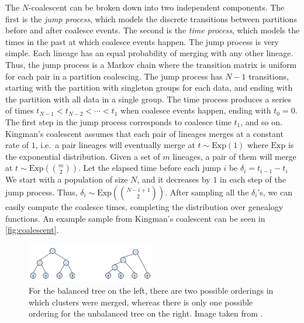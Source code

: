 \documentclass{article}
\begin{document}
The $N$-coalescent
can be broken down into two
independent components.
The first is the \emph{jump process},
which models the discrete transitions
between partitions
before and after coalesce events.
The second is the \emph{time process},
which models the times in the past
at which coalesce events happen.
The jump process is very simple.
Each lineage has an equal probability of merging
with any other lineage. Thus, the
jump process is a Markov chain
where the transition matrix is uniform
for each pair in a partition coalescing.
The jump process has $N - 1$ transitions, starting
with the partition with singleton groups
for each data, and ending with the
partition with all data in a single group.
The time process produces a series of times
$t_{N - 1} < t_{N - 2} < \cdots <  t_1$ when coalesce events happen,
ending with $t_0 = 0$.
The first step in the jump process
corresponds to coalesce time $t_1$, and so on.
Kingman's coalescent assumes
that each pair of lineages merges at a constant rate of $1$,
i.e.\
a pair lineages will eventually merge at
$t \sim \text{Exp}(1)$ where $\text{Exp}$ is the exponential distribution.
Given a set of $m$ lineages,
a pair of them will merge at
$t \sim \text{Exp}(\binom{m}{2})$.
Let the elapsed time before each jump $i$ be
$\delta_i = t_{i - 1} - t_i$
We start with a population of size $N$,
and it decreases by $1$
in each step of the jump process.
Thus, $\delta_i \sim \text{Exp}(\binom{N - i + 1}{2})$.
After sampling all the $\delta_i$'s, we can easily
compute the coalesce times,
completing the distribution over genealogy functions.
An example sample from Kingman's coalescent can be
seen in \autoref{fig:coalescent}.

\begin{figure}[H]
  \centering
  \includegraphics[width=0.5\textwidth]{img/balanced}
  \caption{For the balanced tree on the left, there are two
  possible orderings in which clusters were merged, whereas there is only one possible ordering for the unbalanced tree on the right. Image taken from \citep{Boyles2012}.}
\label{fig:balanced}
\end{figure}
\end{document}
